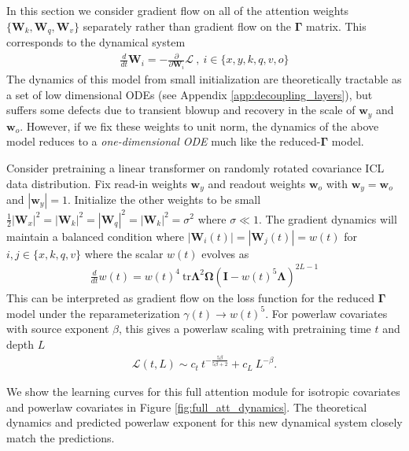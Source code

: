 \documentclass{article} %
\begin{document}
In this section we consider gradient flow on all of the attention weights $\{\bm W_k,\bm W_q, \bm W_v \}$ separately rather than gradient flow on the $\bm\Gamma$ matrix. This corresponds to the dynamical system
\begin{align}
    \frac{d}{dt} \bm W_{i} = - \frac{\partial}{\partial \bm W_{i}} \mathcal L  \ , \ i \in \{ x, y, k, q, v, o \} 
\end{align}
The dynamics of this model from small initialization are theoretically tractable as a set of low dimensional ODEs (see Appendix \ref{app:decoupling_layers}), but suffers some defects due to transient blowup and recovery in the scale of $\bm w_y$ and $\bm w_o$. However, if we fix these weights to unit norm, the dynamics of the above model reduces to a \textit{one-dimensional ODE} much like the reduced-$\bm \Gamma$ model. 

\begin{tcolorbox}[colframe=myblue, opacityback=0.95, title=Result 9: Gradient Flow on Full Linear Attention Module]\label{result:grad_flow_full_att}  
    Consider pretraining a linear transformer on randomly rotated covariance ICL data distribution. Fix read-in weights $\bm w_y$ and readout weights $\bm w_o$ with $\bm w_y = \bm w_o$ and $|\bm w_y| = 1$. Initialize the other weights to be small $\frac{1}{2} |\bm W_x|^2 = |\bm W_k|^2 = |\bm W_q|^2 = |\bm W_k|^2 = \sigma^2$ where $\sigma \ll 1$. The gradient dynamics will maintain a balanced condition where $|\bm W_i(t)| = |\bm W_{j}(t)| = w(t)$ for $i,j\in\{ x, k, q, v \}$ where the scalar $w(t)$ evolves as
    \begin{align}
        \frac{d}{dt} w(t) = w(t)^4  \ \text{tr} \bm\Lambda^2 \bm\Omega \left( \bm I - w(t)^5 \bm\Lambda \right)^{2L-1} 
    \end{align}
    This can be interpreted as gradient flow on the loss function for the reduced $\bm \Gamma$ model under the reparameterization $\gamma(t) \to w(t)^5$. For powerlaw covariates with source exponent $\beta$, this gives a powerlaw scaling with pretraining time $t$ and depth $L$
    \begin{align}
        \mathcal{L}(t,L) \sim  c_t \ t^{ - \frac{5\beta}{5\beta + 2} } + c_L \ L^{-\beta} .
    \end{align}
\end{tcolorbox}

We show the learning curves for this full attention module for isotropic covariates and powerlaw covariates in Figure \ref{fig:full_att_dynamics}. The theoretical dynamics and predicted powerlaw exponent for this new dynamical system closely match the predictions. 
\end{document}
